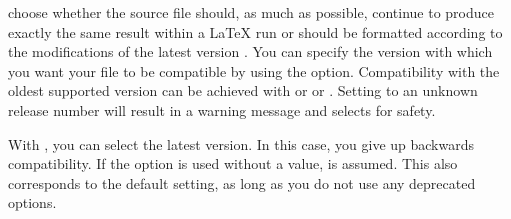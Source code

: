 \begin{Declaration}
\end{Declaration}
choose whether the source file should, as much as possible, 
continue to produce exactly the same result within a \LaTeX{} run or should
be formatted according to the modifications of the latest version%
. You
can specify the version with which you want your file to be compatible by
using the  option. Compatibility with the oldest supported
\KOMAScript{} version can be achieved with
 or
 or . Setting
 to an unknown release number will result in a warning message
and selects  for safety.

With %
, you can select the latest version. In this case, you give
up backwards compatibility. If the option is used without a value,
 is assumed. This also corresponds to the default setting, as long as you
do not use any deprecated options.


